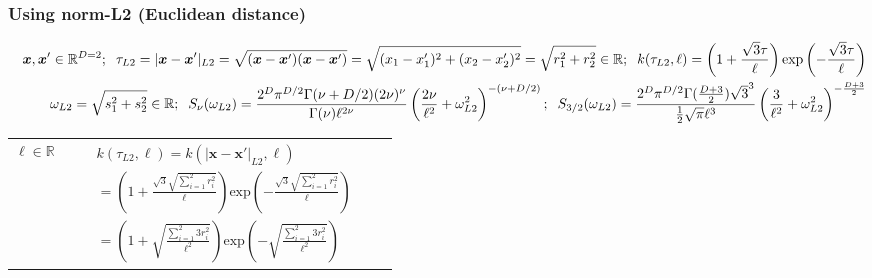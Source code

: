 \documentclass[]{interact}
\theoremstyle{plain}%
\theoremstyle{definition}
\theoremstyle{remark}
\begin{document}
\begin{landscape}
\subsubsection{Using norm-L2 (Euclidean distance)}
\vspace{-8mm}

\begin{table}[H]
\small
\begin{eqnarray*}
\vspace{-20mm}
&&\bm{x}, \bm{x}' \in \mathbb{R}^{D=2}; \hspace{2mm}\tau_{L2} =|\bm{x}-\bm{x}'|_{L2} = \sqrt{(\bm{x}-\bm{x}')(\bm{x}-\bm{x}')} = \sqrt{(x_1-x_1')^2+(x_2-x_2')^2}  = \sqrt{r_1^2+r_2^2} \in \mathbb{R}; \hspace{2mm} k(\tau_{L2},\ell) = \left(1+\frac{\sqrt{3}\tau}{\ell}\right) \mathrm{exp}\left(- \frac{\sqrt{3}\tau}{\ell} \right)\\
&& \omega_{L2}= \sqrt{s_1^2+s_2^2} \in \mathbb{R}; \hspace{2mm} S_{\nu}(\omega_{L2}) = \frac{2^D\pi^{D/2}\Gamma(\nu+D/2)(2\nu)^{\nu}}{\Gamma(\nu)\ell^{2\nu}}\left(\frac{2\nu}{\ell^2}+\omega_{L2}^2 \right)^{-(\nu+D/2)}; \hspace{2mm} S_{3/2}(\omega_{L2}) = \frac{2^D\pi^{D/2}\Gamma(\frac{D+3}{2})\sqrt{3}^3}{\frac{1}{2}\sqrt{\pi}\ell^3}\left(\frac{3}{\ell^2}+\omega_{L2}^2 \right)^{-\frac{D+3}{2}}
\end{eqnarray*}
\normalsize
  \begin{center}
    \begin{tabular}{|c|c|c|c|}
       \hline
       
       \multicolumn{1}{|p{1.5cm}|}{
       \vspace{1mm}
       $\ell \in \mathbb{R}$
       }
       
        & \multicolumn{1}{|p{8.2cm}|}{\small
         \begin{eqnarray*}
		&&k(\tau_{L2},\ell) = k(|\bm{x}-\bm{x}'|_{L2},\ell)\\
		&&= \left(1+\frac{\sqrt{3}\sqrt{\sum_{i=1}^{2}r_i^2}}{\ell} \right)\mathrm{exp}\left(-\frac{\sqrt{3}\sqrt{\sum_{i=1}^{2}r_i^2}}{\ell} \right)\\
		&&= \left(1+\sqrt{\frac{\sum_{i=1}^{2}3r_i^2}{\ell^2}} \right)\mathrm{exp}\left(-\sqrt{\frac{\sum_{i=1}^{2}3r_i^2}{\ell^2}} \right)
         \end{eqnarray*}
       }
       

\end{tabular}
\end{center}
\end{table}
\end{landscape}
\end{document}
